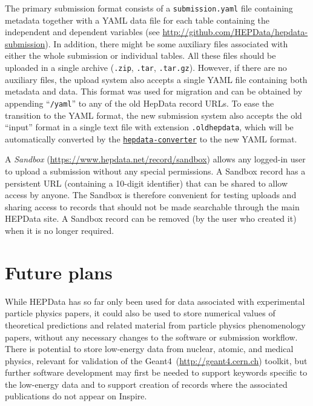 \documentclass[a4paper]{jpconf}
\begin{document}
The primary submission format consists of a \texttt{submission.yaml} file containing metadata together with a YAML data file for each table containing the independent and dependent variables (see \url{http://github.com/HEPData/hepdata-submission}).  In addition, there might be some auxiliary files associated with either the whole submission or individual tables.  All these files should be uploaded in a single archive (\texttt{.zip}, \texttt{.tar}, \texttt{.tar.gz}).  However, if there are no auxiliary files, the upload system also accepts a single YAML file containing both metadata and data.  This format was used for migration and can be obtained by appending ``\texttt{/yaml}'' to any of the old HepData record URLs.  To ease the transition to the YAML format, the new submission system also accepts the old ``input'' format in a single text file with extension \texttt{.oldhepdata}, which will be automatically converted by the \href{https://github.com/HEPData/hepdata-converter}{\texttt{hepdata-converter}} to the new YAML format.

A \emph{Sandbox} (\url{https://www.hepdata.net/record/sandbox}) allows any logged-in user to upload a submission without any special permissions.  A Sandbox record has a persistent URL (containing a 10-digit identifier) that can be shared to allow access by anyone.  The Sandbox is therefore convenient for testing uploads and sharing access to records that should not be made searchable through the main HEPData site.  A Sandbox record can be removed (by the user who created it) when it is no longer required.

\section{Future plans}

While HEPData has so far only been used for data associated with experimental particle physics papers, it could also be used to store numerical values of theoretical predictions and related material from particle physics phenomenology papers, without any necessary changes to the software or submission workflow.  There is potential to store low-energy data from nuclear, atomic, and medical physics, relevant for validation of the Geant4~(\url{http://geant4.cern.ch}) toolkit, but further software development may first be needed to support keywords specific to the low-energy data and to support creation of records where the associated publications do not appear on Inspire.
\end{document}
